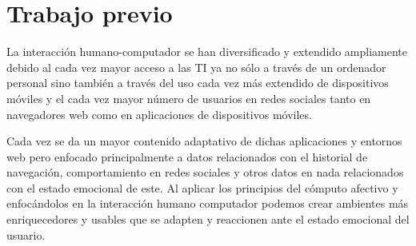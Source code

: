 \section{Trabajo previo}
\noindent
La interacción humano-computador se han diversificado y extendido ampliamente debido al cada vez mayor acceso a las TI ya no sólo a través de un ordenador personal sino también a través del uso cada vez más extendido de dispositivos móviles y el cada vez mayor número de usuarios en redes sociales tanto en navegadores web como en aplicaciones de dispositivos móviles.
\par
Cada vez se da un mayor contenido adaptativo de dichas aplicaciones y entornos web pero enfocado principalmente a datos relacionados con el historial de navegación, comportamiento en redes sociales y otros datos en nada relacionados con el estado emocional de este. Al aplicar los principios del cómputo afectivo y enfocándolos en la interacción humano computador podemos crear ambientes más enriquecedores y usables que se adapten y reaccionen ante el estado emocional del usuario.
\par

